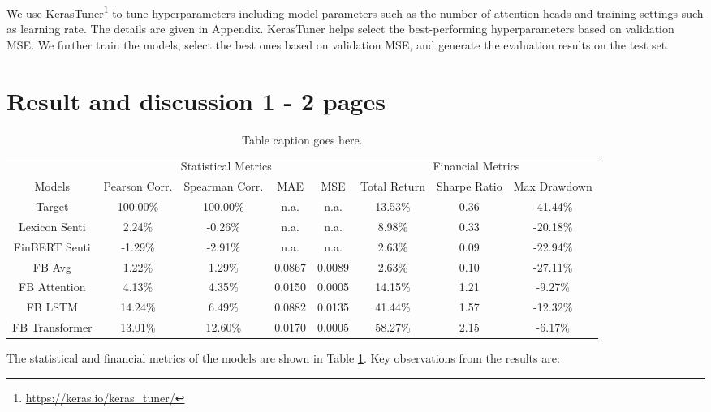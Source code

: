 \documentclass[11pt]{article}
\begin{document}
We use KerasTuner\footnote{\url{https://keras.io/keras_tuner/}} to tune hyperparameters including model parameters such as the number of attention heads and training settings such as learning rate. The details are given in Appendix. KerasTuner helps select the best-performing hyperparameters based on validation MSE. We further train the models, select the best ones based on validation MSE, and generate the evaluation results on the test set.

\section{Result and discussion 1 - 2 pages}

  \begin{table}
  \centering
  \begin{tabular}{c|cccc|ccc}
     & \multicolumn{4}{|c|}{Statistical Metrics} & \multicolumn{3}{c}{Financial Metrics} \\
    \multirow{2}{2em}{Models} & \multirow{2}{2em}{Pearson Corr.} & \multirow{2}{2em}{Spearman Corr.} & \multirow{2}{*}{MAE} & \multirow{2}{*}{MSE} & \multirow{2}{2em}{Total Return} & \multirow{2}{2em}{Sharpe Ratio} & \multirow{2}{2em}{Max Drawdown} \\
    & & & & & & & \\
    \hline
    Target & 100.00\% & 100.00\% & n.a. & n.a. & 13.53\% & 0.36 & -41.44\% \\
    Lexicon Senti & 2.24\% & -0.26\% & n.a. & n.a. & 8.98\% & 0.33 & -20.18\% \\
    FinBERT Senti & -1.29\% & -2.91\% & n.a. & n.a. & 2.63\% & 0.09 & -22.94\% \\
    FB Avg & 1.22\% & 1.29\% & 0.0867 & 0.0089 & 2.63\% & 0.10 & -27.11\% \\
    FB Attention & 4.13\% & 4.35\% & 0.0150 & 0.0005 & 14.15\% & 1.21 & -9.27\% \\
    FB LSTM & 14.24\% & 6.49\% & 0.0882 & 0.0135 & 41.44\% & 1.57 & -12.32\% \\
    FB Transformer & 13.01\% & 12.60\% & 0.0170 & 0.0005 & 58.27\% & 2.15 & -6.17\% \\

    \end{tabular}
    \label{tab:results}
    \caption{Table caption goes here.}
  \end{table}

The statistical and financial metrics of the models are shown in Table \ref{tab:results}. Key observations from the results are:
\end{document}
